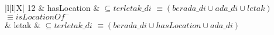 \begin{longtabu}{|l|l|X|}
	12	&	hasLocation	&	\begin{math} \subseteq terletak\_di \end{math} \newline \begin{math} \equiv (berada\_di \cup ada\_di \cup letak) \end{math} \newline \begin{math}\equiv isLocationOf^- \end{math} \\ 	&	letak	&	\begin{math} \subseteq terletak\_di \end{math} \newline \begin{math} \equiv (berada\_di \cup hasLocation \cup ada\_di) \end{math} \\ \hline
\end{longtabu}
